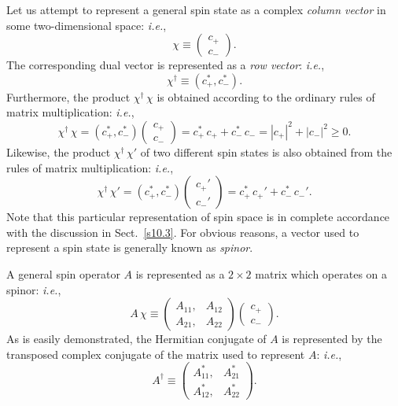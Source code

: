 Let us attempt to represent a general spin state as a complex {\em column vector}\/ in some two-dimensional space: {\em i.e.},
\begin{equation}
\chi \equiv \left(\begin{array}{c}c_+\\c_-\end{array}\right).
\end{equation}
The corresponding dual vector is represented as a {\em row vector}: {\em i.e.},
\begin{equation}
\chi^\dag\equiv  (c_+^\ast, c_-^\ast).
\end{equation}
Furthermore, the product $\chi^\dag\,\chi$ is obtained according to the
ordinary rules of matrix multiplication: {\em i.e.},
\begin{equation}
\chi^\dag\,\chi =  (c_+^\ast, c_-^\ast)\left(\begin{array}{c}c_+\\c_-\end{array}\right) = c_+^\ast\,c_+ + c_-^\ast\,c_- = |c_+|^2 + |c_-|^2\geq 0.
\end{equation}
Likewise, the product $\chi^\dag\,\chi'$ of two different spin states
is also obtained from the rules of matrix multiplication: {\em i.e.},
\begin{equation}
\chi^\dag\,\chi' =  (c_+^\ast, c_-^\ast)\left(\begin{array}{c}c_+'\\c_-'\end{array}\right) = c_+^\ast\,c_+' + c_-^\ast\,c_-'.
\end{equation}
Note that this particular representation of spin space is in complete accordance with the discussion in Sect.~\ref{s10.3}. For obvious reasons,
 a vector used to represent a spin state is generally known as
{\em spinor}.

A general spin operator $A$ is represented as a $2\times 2$ matrix
which operates on a spinor: {\em i.e.},
\begin{equation}
A\,\chi \equiv \left(\begin{array}{cc}A_{11},& A_{12}\\
A_{21},& A_{22}\end{array}\right)\left(\begin{array}{c}c_+\\c_-\end{array}\right).
\end{equation}
As is easily demonstrated, the Hermitian conjugate of $A$ is represented by
the transposed complex conjugate of the matrix used to represent $A$: {\em i.e.},
\begin{equation}
A^\dag \equiv \left(\begin{array}{cc}A_{11}^\ast,& A_{21}^\ast\\
A_{12}^\ast,& A_{22}^\ast\end{array}\right).
\end{equation}

